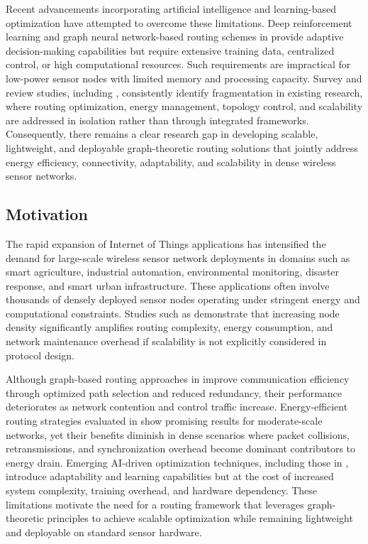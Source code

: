 \documentclass[a4paper,fleqn]{cas-dc}
\numberwithin{equation}{section}
\begin{document}
Recent advancements incorporating artificial intelligence and learning-based optimization have attempted to overcome these limitations. Deep reinforcement learning and graph neural network-based routing schemes in \cite{r2,r19,r27,r30} provide adaptive decision-making capabilities but require extensive training data, centralized control, or high computational resources. Such requirements are impractical for low-power sensor nodes with limited memory and processing capacity. Survey and review studies, including \cite{r3,r14,r18,r29}, consistently identify fragmentation in existing research, where routing optimization, energy management, topology control, and scalability are addressed in isolation rather than through integrated frameworks. Consequently, there remains a clear research gap in developing scalable, lightweight, and deployable graph-theoretic routing solutions that jointly address energy efficiency, connectivity, adaptability, and scalability in dense wireless sensor networks.

\subsection{Motivation}

The rapid expansion of Internet of Things applications has intensified the demand for large-scale wireless sensor network deployments in domains such as smart agriculture, industrial automation, environmental monitoring, disaster response, and smart urban infrastructure. These applications often involve thousands of densely deployed sensor nodes operating under stringent energy and computational constraints. Studies such as \cite{B6,r1} demonstrate that increasing node density significantly amplifies routing complexity, energy consumption, and network maintenance overhead if scalability is not explicitly considered in protocol design.

Although graph-based routing approaches in \cite{B3,B4,sensors2018} improve communication efficiency through optimized path selection and reduced redundancy, their performance deteriorates as network contention and control traffic increase. Energy-efficient routing strategies evaluated in \cite{B2,B5} show promising results for moderate-scale networks, yet their benefits diminish in dense scenarios where packet collisions, retransmissions, and synchronization overhead become dominant contributors to energy drain. Emerging AI-driven optimization techniques, including those in \cite{r2,r27,r30}, introduce adaptability and learning capabilities but at the cost of increased system complexity, training overhead, and hardware dependency. These limitations motivate the need for a routing framework that leverages graph-theoretic principles to achieve scalable optimization while remaining lightweight and deployable on standard sensor hardware.
\end{document}
